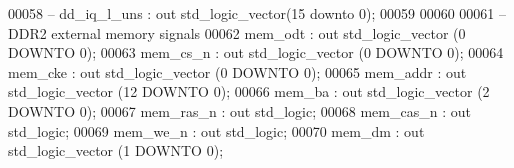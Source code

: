 \begin{DoxyCode}
00058 \textcolor{keyword}{--      dd\_iq\_l\_uns             : out std\_logic\_vector(15 downto 0);}
00059 
00060 
00061 \textcolor{keyword}{        --DDR2 external memory signals  }
00062         \textcolor{vhdlchar}{mem_odt}                 \textcolor{vhdlchar}{:} \textcolor{keywordflow}{out} \textcolor{comment}{std\_logic\_vector} \textcolor{vhdlchar}{(}\textcolor{vhdllogic}{}\textcolor{vhdllogic}{0} \textcolor{keywordflow}{DOWNTO} \textcolor{vhdllogic}{}\textcolor{vhdllogic}{0}\textcolor{vhdlchar}{)};
00063         \textcolor{vhdlchar}{mem_cs_n}                    \textcolor{vhdlchar}{:} \textcolor{keywordflow}{out} \textcolor{comment}{std\_logic\_vector} \textcolor{vhdlchar}{(}\textcolor{vhdllogic}{}\textcolor{vhdllogic}{0} \textcolor{keywordflow}{DOWNTO} \textcolor{vhdllogic}{}\textcolor{vhdllogic}{0}\textcolor{vhdlchar}{)};
00064         \textcolor{vhdlchar}{mem_cke}                 \textcolor{vhdlchar}{:} \textcolor{keywordflow}{out} \textcolor{comment}{std\_logic\_vector} \textcolor{vhdlchar}{(}\textcolor{vhdllogic}{}\textcolor{vhdllogic}{0} \textcolor{keywordflow}{DOWNTO} \textcolor{vhdllogic}{}\textcolor{vhdllogic}{0}\textcolor{vhdlchar}{)};
00065         \textcolor{vhdlchar}{mem_addr}                    \textcolor{vhdlchar}{:} \textcolor{keywordflow}{out} \textcolor{comment}{std\_logic\_vector} \textcolor{vhdlchar}{(}\textcolor{vhdllogic}{}\textcolor{vhdllogic}{12} \textcolor{keywordflow}{DOWNTO} \textcolor{vhdllogic}{}\textcolor{vhdllogic}{0}\textcolor{vhdlchar}{)};
00066         \textcolor{vhdlchar}{mem_ba}                  \textcolor{vhdlchar}{:} \textcolor{keywordflow}{out} \textcolor{comment}{std\_logic\_vector} \textcolor{vhdlchar}{(}\textcolor{vhdllogic}{}\textcolor{vhdllogic}{2} \textcolor{keywordflow}{DOWNTO} \textcolor{vhdllogic}{}\textcolor{vhdllogic}{0}\textcolor{vhdlchar}{)};
00067         \textcolor{vhdlchar}{mem_ras_n}               \textcolor{vhdlchar}{:} \textcolor{keywordflow}{out} \textcolor{comment}{std\_logic};
00068         \textcolor{vhdlchar}{mem_cas_n}               \textcolor{vhdlchar}{:} \textcolor{keywordflow}{out} \textcolor{comment}{std\_logic};
00069         \textcolor{vhdlchar}{mem_we_n}                    \textcolor{vhdlchar}{:} \textcolor{keywordflow}{out} \textcolor{comment}{std\_logic};
00070         \textcolor{vhdlchar}{mem_dm}                  \textcolor{vhdlchar}{:} \textcolor{keywordflow}{out} \textcolor{comment}{std\_logic\_vector} \textcolor{vhdlchar}{(}\textcolor{vhdllogic}{}\textcolor{vhdllogic}{1} \textcolor{keywordflow}{DOWNTO} \textcolor{vhdllogic}{}\textcolor{vhdllogic}{0}\textcolor{vhdlchar}{)};

\end{DoxyCode}
